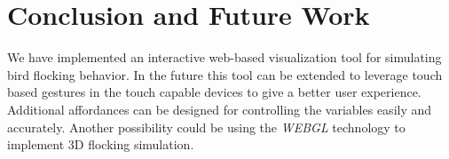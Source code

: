 \documentclass[../main]{subfiles}
\begin{document}
\section{Conclusion and Future Work}
\label{concFuture}

We have implemented an interactive web-based visualization tool for simulating bird flocking behavior.
In the future this tool can be extended to leverage touch based gestures in the touch capable devices to give a better user experience. Additional affordances can be designed for controlling the variables easily and accurately. Another possibility could be using the {\em WEBGL} technology to implement 3D flocking simulation.
\end{document}
